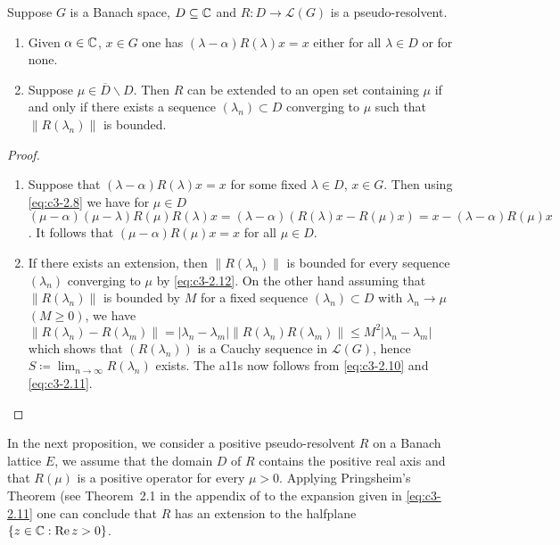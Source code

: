 \begin{proposition}\label{prop:c3-2.6}
	Suppose $G$ is a Banach space, $D \subseteq \mathbb{C} $ and $R \colon D \to \mathcal{L}(G)$ is a pseudo-resolvent.
	
	\begin{enumerate}[\upshape (i), wide, labelsep=1em, itemsep=1ex]
		\item Given $\alpha \in \mathbb{C} $, $x \in G$ one has $(\lambda-\alpha)R(\lambda)x = x$ either for all $\lambda \in D$ or for none.
		
		\item Suppose $\mu \in \overline{D}\backslash D$. Then $R$ can be extended to an open set containing $\mu$ if and only if there exists a sequence $(\lambda_{n}) \subset D$ converging to $\mu$ such that $\|R(\lambda_{n})\|$ is bounded.
	\end{enumerate}
\end{proposition}

\begin{proof}
	\begin{enumerate}[\upshape (i), wide, labelsep=1em, itemsep=1ex]
		\item Suppose that $(\lambda-\alpha)R(\lambda)x = x$ for some fixed $\lambda \in D$, $x \in G$.
		Then using \eqref{eq:c3-2.8} we have for $\mu \in D$ $(\mu-\alpha)(\mu-\lambda)R(\mu)R(\lambda)x = (\lambda-\alpha)(R(\lambda)x - R(\mu)x) = x - (\lambda-\alpha)R(\mu)x$.
		It follows that $(\mu-\alpha)R(\mu)x = x$ for all $\mu \in D$.
		
		\item If there exists an extension, then $\|R(\lambda_{n})\|$ is bounded for every sequence $(\lambda_{n})$ converging to $\mu$ by \eqref{eq:c3-2.12}.
		On the other hand assuming that $\|R(\lambda_{n})\|$ is bounded by $M$ for a fixed sequence $(\lambda_{n}) \subset D$ with $\lambda_{n} \to \mu$ $(M \geq 0)$, we have
		\newline
		 $\|R(\lambda_{n}) - R(\lambda_{m})\| = |\lambda_{n}-\lambda_{m}| \|R(\lambda_{n})R(\lambda_{m})\| \leq M^2|\lambda_{n}-\lambda_{m}|$ which shows that $(R(\lambda_{n}))$ is a Cauchy sequence in $\mathcal{L}(G)$, hence $S \coloneq \lim_{n\to\infty}R(\lambda_{n})$ exists.
		The a11s now follows from \eqref{eq:c3-2.10} and \eqref{eq:c3-2.11}.
	\end{enumerate}
\end{proof}

In the next proposition, we consider a positive pseudo-resolvent $R$ on a Banach lattice $E$, \ie  we assume that the domain $D$ of $R$ contains the positive real axis and that $R(\mu)$ is a positive operator for every $\mu > 0$.
Applying Pringsheim's Theorem (see Theorem~2.1 in the appendix
%
%
of \citet{schaefer:1966} to the expansion given in \eqref{eq:c3-2.11} one can conclude that $R$ has an extension to the halfplane $\{z \in \mathbb{C}  : \mathop{}\!\mathrm{Re}\, z > 0\}$.

